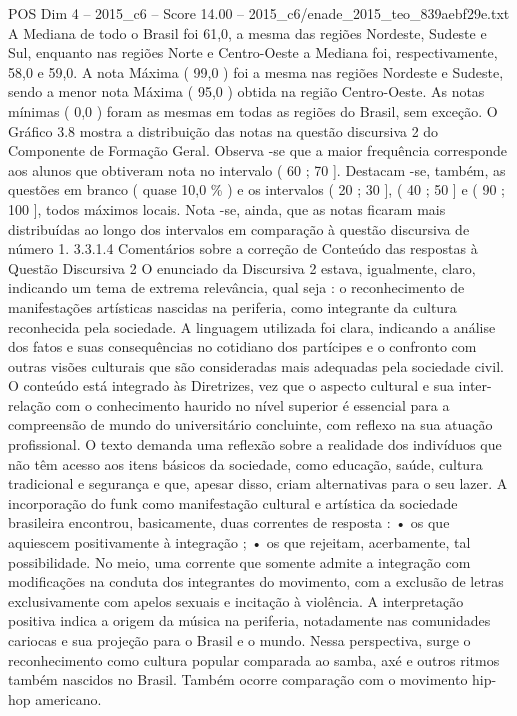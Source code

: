 \begin{textsample}{POS Dim 4 – 2015\_c6 – Score 14.00 – 2015\_c6/enade\_2015\_teo\_839aebf29e.txt}
A Mediana de todo o Brasil foi 61,0, a mesma das regiões Nordeste, Sudeste e Sul, enquanto nas regiões Norte e Centro-Oeste a Mediana foi, respectivamente, 58,0 e 59,0.
A nota Máxima ( 99,0 ) foi a mesma nas regiões Nordeste e Sudeste, sendo a menor nota Máxima ( 95,0 ) obtida na região Centro-Oeste.
As notas mínimas ( 0,0 ) foram as mesmas em todas as regiões do Brasil, sem exceção.
O Gráfico 3.8 mostra a distribuição das notas na questão discursiva 2 do Componente de Formação Geral.
Observa -se que a maior frequência corresponde aos alunos que obtiveram nota no intervalo ( 60 ; 70 ].
Destacam -se, também, as questões em branco ( quase 10,0 \% ) e os intervalos ( 20 ; 30 ], ( 40 ; 50 ] e ( 90 ; 100 ], todos máximos locais.
Nota -se, ainda, que as notas ficaram mais distribuídas ao longo dos intervalos em comparação à questão discursiva de número 1. 3.3.1.4 Comentários sobre a correção de Conteúdo das respostas à Questão Discursiva 2 O enunciado da Discursiva 2 estava, igualmente, claro, indicando um tema de extrema relevância, qual seja : o reconhecimento de manifestações artísticas nascidas na periferia, como integrante da cultura reconhecida pela sociedade.
A linguagem utilizada foi clara, indicando a análise dos fatos e suas consequências no cotidiano dos partícipes e o confronto com outras visões culturais que são consideradas mais adequadas pela sociedade civil.
O conteúdo está integrado às Diretrizes, vez que o aspecto cultural e sua inter-relação com o conhecimento haurido no nível superior é essencial para a compreensão de mundo do universitário concluinte, com reflexo na sua atuação profissional.
O texto demanda uma reflexão sobre a realidade dos indivíduos que não têm acesso aos itens básicos da sociedade, como educação, saúde, cultura tradicional e segurança e que, apesar disso, criam alternativas para o seu lazer.
A incorporação do funk como manifestação cultural e artística da sociedade brasileira encontrou, basicamente, duas correntes de resposta : • os que aquiescem positivamente à integração ; • os que rejeitam, acerbamente, tal possibilidade.
No meio, uma corrente que somente admite a integração com modificações na conduta dos integrantes do movimento, com a exclusão de letras exclusivamente com apelos sexuais e incitação à violência.
A interpretação positiva indica a origem da música na periferia, notadamente nas comunidades cariocas e sua projeção para o Brasil e o mundo.
Nessa perspectiva, surge o reconhecimento como cultura popular comparada ao samba, axé e outros ritmos também nascidos no Brasil.
Também ocorre comparação com o movimento hip-hop americano.

\end{textsample}

